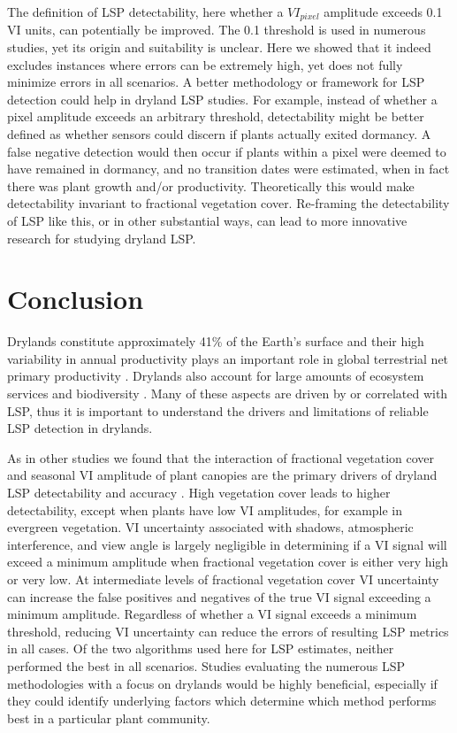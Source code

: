 \documentclass{article}
\begin{document}
The definition of LSP detectability, here whether a $VI_{pixel}$ amplitude exceeds 0.1 VI units, can potentially be improved. The 0.1 threshold is used in numerous studies, yet its origin and suitability is unclear. Here we showed that it indeed excludes instances where errors can be extremely high, yet does not fully minimize errors in all scenarios. A better methodology or framework for LSP detection could help in dryland LSP studies. For example, instead of whether a pixel amplitude exceeds an arbitrary threshold, detectability might be better defined as whether sensors could discern if plants actually exited dormancy. A false negative detection would then occur if plants within a pixel were deemed to have remained in dormancy, and no transition dates were estimated, when in fact there was plant growth and/or productivity. Theoretically this would make detectability invariant to fractional vegetation cover. Re-framing the detectability of LSP like this, or in other substantial ways, can lead to more innovative research for studying dryland LSP.


\section{Conclusion}

Drylands constitute approximately 41\% of the Earth’s surface \cite{hoover2020} and their high variability in annual productivity plays an important role in global terrestrial net primary productivity \cite{ahlstrom2015}. Drylands also account for large amounts of ecosystem services and biodiversity \cite{safriel2005, chapin1996}. Many of these aspects are driven by or correlated with LSP, thus it is important to understand the drivers and limitations of reliable LSP detection in drylands.

As in other studies we found that the interaction of fractional vegetation cover and seasonal VI amplitude of plant canopies are the primary drivers of dryland LSP detectability and accuracy \cite{smith2019, peng2021}. High vegetation cover leads to higher detectability, except when plants have low VI amplitudes, for example in evergreen vegetation. VI uncertainty associated with shadows, atmospheric interference, and view angle is largely negligible in determining if a VI signal will exceed a minimum amplitude when fractional vegetation cover is either very high or very low. At intermediate levels of fractional vegetation cover VI uncertainty can increase the false positives and negatives of the true VI signal exceeding a minimum amplitude. Regardless of whether a VI signal exceeds a minimum threshold, reducing VI uncertainty can reduce the errors of resulting LSP metrics in all cases. Of the two algorithms used here for LSP estimates, neither performed the best in all scenarios. Studies evaluating the numerous LSP methodologies with a focus on drylands would be highly beneficial, especially if they could identify underlying factors which determine which method performs best in a particular plant community.  
\end{document}
